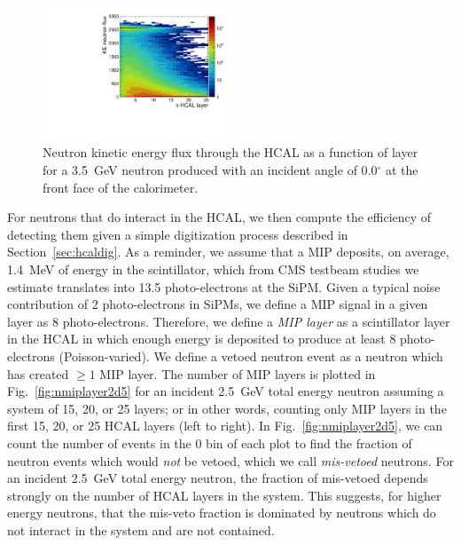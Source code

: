 \begin{figure}[hbtp]
\begin{center}
    \includegraphics[width=0.5\textwidth]{images/hcal/NFlux_vs_Layer_e3d5_th0d0.pdf}
    \caption{Neutron kinetic energy flux through the HCAL as a function of layer for a 3.5~GeV neutron produced with an incident angle of 0.0$^{\circ}$ at the front face of the calorimeter.}
 \label{fig:neturonflux}
 \end{center}
\end{figure}

For neutrons that do interact in the HCAL, we then compute the efficiency of detecting them given a simple digitization process described in Section~\ref{sec:hcaldig}.
As a reminder, we assume that a MIP deposits, on average, 1.4~MeV of energy in the scintillator, which from CMS testbeam studies we estimate translates into 13.5 photo-electrons at the SiPM.  
Given a typical noise contribution of 2 photo-electrons in SiPMs, we define a MIP signal in a given layer as 8 photo-electrons.  
Therefore, we define a {\it MIP layer} as a scintillator layer in the HCAL in which enough energy is deposited to produce at least 8 photo-electrons (Poisson-varied).   
We define a vetoed neutron event as a neutron which has created $\geq 1$ MIP layer. 
The number of MIP layers is plotted in Fig.~\ref{fig:nmiplayer2d5} for an incident 2.5~GeV total energy neutron assuming a system of 15, 20, or 25 layers; or in other words, counting only MIP layers in the first 15, 20, or 25 HCAL layers (left to right). 
In Fig.~\ref{fig:nmiplayer2d5}, we can count the number of events in the 0 bin of each plot to find the fraction of neutron events which would {\it not} be vetoed, which we call {\it mis-vetoed} neutrons.
For an incident 2.5~GeV total energy neutron, the fraction of mis-vetoed depends strongly on the number of HCAL layers in the system.  
This suggests, for higher energy neutrons, that the mis-veto fraction is dominated by neutrons which do not interact in the system and are not contained.  

